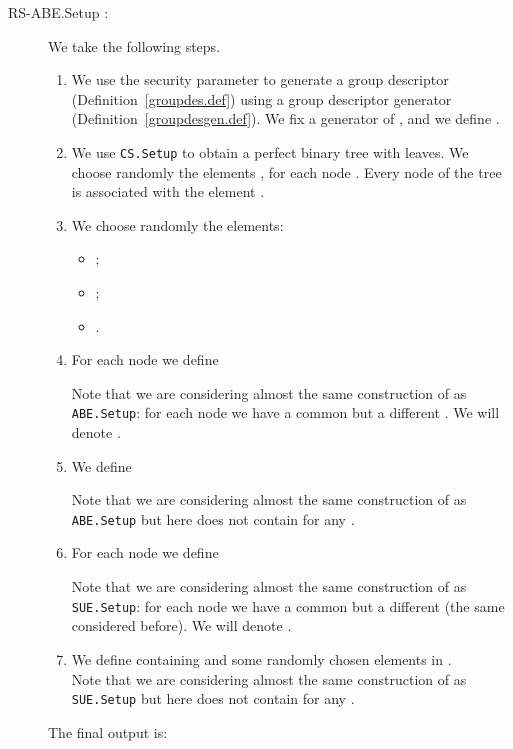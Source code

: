 \documentclass[a4paper,10pt]{article}
\newcommand{\maps}[2]{}
\newcommand{\algorithm}[2]{\texttt{#1.#2}}
\newcommand{\algorithmdef}[4]{\item[#1.#2 \maps{#3}{#4}:]}
\newcommand{\randomchoose}[1]{We choose randomly the element\ifstrequal{#1}{s}{}{s} }
\begin{document}
	\begin{description}
	\algorithmdef{RS-ABE}{Setup}{\lambda,\mathfrak{A},T_{\textnormal{max}},N_{\textnormal{max}}}{\mathit{\mathrm{MK}},\mathit{\mathrm{PI}},\mathit{\mathrm{PK}}} 


	We take the following steps.
	\begin{enumerate}
		\item
		We use the security parameter to generate a group descriptor  (De\-finition~\ref{groupdes.def}) using a group descriptor generator  (Definition~\ref{groupdesgen.def}). We fix a generator  of , and we define .
		\item
		We use \algorithm{CS}{Setup} to obtain a perfect binary tree  with  leaves.
		\randomchoose{p}, for each node .
		Every node  of the tree  is associated with the element .
		\item
		We choose randomly the elements:
		\begin{itemize}
\item ;
		\item ;
		\item .
	\end{itemize}
		
		\item
		For each node  we define 
	
	
	Note that we are considering almost the same construction of  as \algorithm{ABE}{Setup}:  for each node  we have a common  but a different . We will denote .
	\item
	We define
	
Note that we are considering almost the same construction of  as \algorithm{ABE}{Setup} but here    does not contain  for any .
\item
For each node  we define
	
	
	Note that we are considering almost the same construction of  as \algorithm{SUE}{Setup}: for each node  we have a common  but a different  (the same considered before). We will denote .
	\item
	We define  containing  and some randomly chosen elements in .\\
	Note that we are considering almost the same construction of  as \algorithm{SUE}{Setup} but here    does not contain  for any .



	\end{enumerate}
	The final output is:
	
	
	

\end{description}
\end{document}
